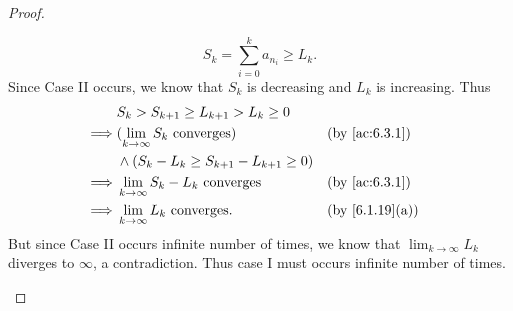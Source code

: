 \begin{proof}
\begin{itemize}
\[            S_k = \sum_{i = 0}^k a_{n_i} \geq L_k.
          \]
          Since Case II occurs, we know that \(S_k\) is decreasing and \(L_k\) is increasing.
          Thus
          \begin{align*}
                     & S_k > S_{k + 1} \geq L_{k + 1} > L_k \geq 0                                           \\
            \implies & (\lim_{k \to \infty} S_k \text{ converges})         &  & \text{(by \cref{ac:6.3.1})}  \\
                     & \land (S_k - L_k \geq S_{k + 1} - L_{k + 1} \geq 0)                                   \\
            \implies & \lim_{k \to \infty} S_k - L_k \text{ converges}     &  & \text{(by \cref{ac:6.3.1})}  \\
            \implies & \lim_{k \to \infty} L_k \text{ converges}.          &  & \text{(by \cref{6.1.19}(a))}
          \end{align*}
          But since Case II occurs infinite number of times, we know that \(\lim_{k \to \infty} L_k\) diverges to \(\infty\), a contradiction.
          Thus case I must occurs infinite number of times.


\end{itemize}
\end{proof}
